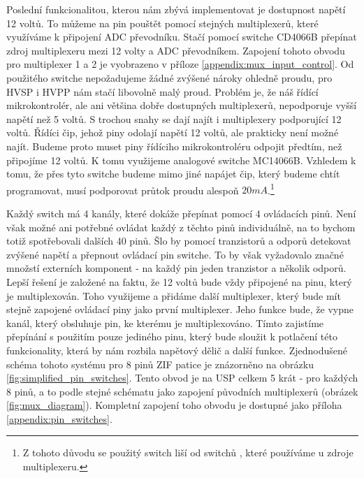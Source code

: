 \documentclass[11pt,a4paper,twoside,openright]{report}
\begin{document}
Poslední funkcionalitou, kterou nám zbývá implementovat je dostupnost napětí 12 voltů. To můžeme na pin pouštět pomocí stejných multiplexerů, které využíváme k připojení ADC převodníku. Stačí pomocí switche CD4066B \cite{switch2} přepínat zdroj multiplexeru mezi 12 volty a ADC převodníkem. Zapojení tohoto obvodu pro multiplexer 1 a 2 je vyobrazeno v příloze  \ref{appendix:mux_input_control}. Od použitého switche nepožadujeme žádné zvýšené nároky ohledně proudu, pro HVSP i HVPP nám stačí libovolně malý proud. Problém je, že náš řídící mikrokontrolér, ale ani většina dobře dostupných multiplexerů, nepodporuje vyšší napětí než 5 voltů. S trochou snahy se dají najít i multiplexery podporující 12 voltů. Řídíci čip, jehož piny odolají napětí 12 voltů, ale prakticky není možné najít. Budeme proto muset piny řídíciho mikrokontroléru odpojit předtím, než připojíme 12 voltů. K tomu využijeme analogové switche MC14066B.\cite{switch1} Vzhledem k tomu, že přes tyto switche budeme mimo jiné napájet čip, který budeme chtít programovat, musí podporovat průtok proudu alespoň $20mA$.\footnote{Z tohoto důvodu se použitý switch liší od switchů \cite{switch2}, které používáme u zdroje multiplexeru.} 

Každý switch má 4 kanály, které dokáže přepínat pomocí 4 ovládacích pinů. Není však možné ani potřebné ovládat každý z těchto pinů individuálně, na to bychom totiž spotřebovali dalších 40 pinů. Šlo by pomocí tranzistorů a odporů detekovat zvýšené napětí a přepnout ovládací pin switche. To by však vyžadovalo značné množstí externích komponent - na každý pin jeden tranzistor a několik odporů. Lepší řešení je založené na faktu, že 12 voltů bude vždy připojené na pinu, který je multiplexován. Toho využijeme a přidáme další multiplexer, který bude mít stejně zapojené ovládací piny jako první multiplexer. Jeho funkce bude, že vypne kanál, který obsluhuje pin, ke kterému je multiplexováno. Tímto zajistíme přepínání s použitím pouze jediného pinu, který bude sloužit k potlačení této funkcionality, která by nám rozbila napětový dělič a další funkce. Zjednodušené schéma tohoto systému pro 8 pinů ZIF patice je znázorněno na obrázku \ref{fig:simplified_pin_switches}. Tento obvod je na USP celkem 5 krát - pro každých 8 pinů, a to podle stejné schématu jako zapojení původních multiplexerů (obrázek \ref{fig:mux_diagram}). Kompletní zapojení toho obvodu je dostupné jako příloha \ref{appendix:pin_switches}.
\end{document}
